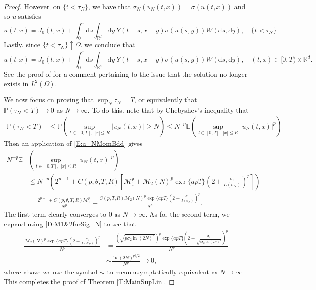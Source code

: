 \documentclass[a4paper,11pt]{article}
\numberwithin{equation}{section}
\theoremstyle{plain}
\theoremstyle{definition}
\newcommand{\ud}{\ensuremath{\mathrm{d} }}
\newcommand{\R}{\mathbb{R}}
\numberwithin{NQ}{section}
\numberwithin{LQ}{section}
\numberwithin{ZQ}{section}
\begin{document}
\begin{proof}
    However, on $\{ t < \tau_N \}$, we have that $\sigma_N(u_N(t,x)) = \sigma(u(t,x))$ and so $u$
    satisfies
		\[
		u(t,x) = J_0(t,x) + \int_0^t \ud s \int_{\R^d} \ud y \; Y(t-s,x-y) \sigma(u(s,y)) W(\ud s, \ud y), \quad \{ t < \tau_N \}.
		\]
    Lastly, since $\{ t < \tau_N \} \uparrow \Omega$, we conclude that
		\begin{equation}
		\label{E:SupLinMildSol}
		u(t,x) = J_0(t,x) + \int_0^t \ud s \int_{\R^d} \ud y \; Y(t-s,x-y) \sigma(u(s,y)) W(\ud s, \ud y), \quad (t,x) \in [0,T) \times \R^d.
		\end{equation}
    See the proof of \cite[Theorem 3.5]{millet.sanz-sole:21:global} for a comment pertaining to the
    issue that the solution no longer exists in $L^2(\Omega)$.

    We now focus on proving that $\sup_N \tau_N = T$, or equivalently that $ \mathbb{P}\left(\tau_N
    <T\right) \to 0$ as $N \to \infty$. To do this, note that by Chebyshev's inequality that
		\begin{align*}
		\mathbb{P}\left( \tau_N < T \right) &\le \mathbb{P}\left(\sup_{t\in[0,T],\; |x| \le R} |u_N(t,x)| \ge N \right)
		\le N^{-p}\mathbb{E}\left( \sup_{t\in[0,T],\; |x| \le R} |u_N(t,x)|^p \right).
		\end{align*}
    Then an application of \eqref{E:u_NMomBdd} gives
		\begin{align*}
      N^{-p}\mathbb{E} & \left( \sup_{t\in[0,T],\; |x| \le R} |u_N(t,x)|^p \right)                                                                                                            \\
                       & \le N^{-p}\left(  2^{p-1} + C(p, \theta, T,R) \left[ \mathcal{M}_1^p + \mathcal{M}_2(N)^p \exp\{apT\} \left(2 +  \frac{\sigma_1}{L(\sigma_N)}\right)^p\right]\right) \\
                       & = \frac{2^{p-1} + C(p, \theta, T,R)\mathcal{M}_1^p }{N^p} + \frac{C(p,T,R) \mathcal{M}_2(N)^p \exp\{apT\} \left(2 +  \frac{\sigma_1}{L(\sigma_N)}\right)^p }{ N^p }.
		\end{align*}
    The first term clearly converges to $0$ as $N\to \infty$. As for the second term, we expand
      using \eqref{D:M1&2forSig_N} to see that
		\begin{align*}
      \frac{\mathcal{M}_2(N)^p \exp\{apT\} \left(2 +  \frac{\sigma_1}{L(\sigma_N)}\right)^p }{ N^p }
      & = \frac{\left(\sqrt{p\sigma_2\ln(2N)^\delta}\right)^p \exp\{apT\} \left(2 +  \frac{\sigma_1}{ \sqrt{p\sigma_2\ln(2N)^\delta} }\right)^p }{ N^p } \\
      & \sim \frac{ \ln(2N)^{p\delta/2} }{ N^p } \to 0,
		\end{align*}
    where above we use the symbol $\sim$ to mean asymptotically equivalent as $N \to \infty$. This
    completes the proof of Theorem \ref{T:MainSupLin}.
  \end{proof}
\end{document}
